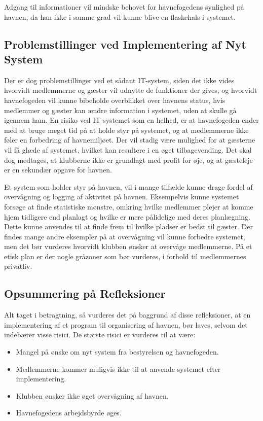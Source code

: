 Adgang til informationer vil mindske behovet for havnefogedens synlighed på havnen, da han ikke i samme grad vil kunne blive en flaskehals i systemet.

\subsection{Problemstillinger ved Implementering af Nyt System}

Der er dog problemstillinger ved et sådant IT-system, siden det ikke vides hvorvidt medlemmerne og gæster vil udnytte de funktioner der gives, og hvorvidt havnefogeden vil kunne bibeholde overblikket over havnens status, hvis medlemmer og gæster kan ændre information i systemet, uden at skulle gå igennem ham. En risiko ved IT-systemet som en helhed, er at havnefogeden ender med at bruge meget tid på at holde styr på systemet, og at medlemmerne ikke føler en forbedring af havnemiljøet. Der vil stadig være mulighed for at gæsterne vil få glæde af systemet, hvilket kan resultere i en øget tilbagevending. Det skal dog medtages, at klubberne ikke er grundlagt med profit for øje, og at gæsteleje er en sekundær opgave for havnen.

Et system som holder styr på havnen, vil i mange tilfælde kunne drage fordel af overvågning og logging af aktivitet på havnen. Eksempelvis kunne systemet forsøge at finde statistiske mønstre, omkring hvilke medlemmer plejer at komme hjem tidligere end planlagt og hvilke er mere pålidelige med deres planlægning. Dette kunne anvendes til at finde frem til hvilke pladser er bedst til gæster. Der findes mange andre eksempler på at overvågning vil kunne forbedre systemet, men det bør vurderes hvorvidt klubben ønsker at overvåge medlemmerne. På et etisk plan er der nogle gråzoner som bør vurderes, i forhold til medlemmernes privatliv.

\subsection{Opsummering på Refleksioner}

Alt taget i betragtning, så vurderes det på baggrund af disse refleksioner, at en implementering af et program til organisering af havnen, bør laves, selvom det indebærer visse risici. De største risici er vurderes til at være:

\begin{itemize}
  \item Mangel på ønske om nyt system fra bestyrelsen og havnefogeden.
  \item Medlemmerne kommer muligvis ikke til at anvende systemet efter implementering.
  \item Klubben ønsker ikke øget overvågning af havnen.
  \item Havnefogedens arbejdsbyrde øges.
\end{itemize}

